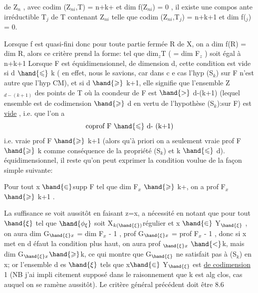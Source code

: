 
de Z$_n$ , avec codim (Z$_{ni}$,T) = n+k+ et dim f(Z$_{ni}$) = 0 , il existe
une compos ante irréductible T$_j$ de T contenant Z$_{ni}$ telle que
codim (Z$_{ni}$,T$_j$) = n+k+1 et dim f($_j$) = 0.

Lorsque f est quasi-fini donc pour toute partie fermée R de X,
on a dim f(R) = dim R, alors ce critère prend la forme:  
  tel que dim$_z$T ( = dim F$_z$ ) soit égal à
n+k+1  Lorsque F est équidimensionnel, 
de dimension d,  cette condition
est vide si d $\hand{\leqslant}$ k ( en effet, nous le savions, car dans c e cas l'hyp
(S$_k$) sur F n'est autre que l'hyp CM), et si d $\hand{\geqslant}$ k+1, elle signifie
que l'ensemble Z$_{d - (k+1)}$ des points de T où la coondeur de F est
$\hand{>}$ d-(k+1) (lequel ensemble est de codimension $\hand{\geqslant}$ d  en vertu de
l'hypothèse (S$_k$):sur F) est \uline{vide} , i.e. que 
l'on a 
\[ \text{coprof F } \hand{\leqslant} \text{ d- (k+1)} \]
i.e. vraie prof F $\hand{\geqslant}$ k+1
(alors qu'à priori on a seulement vraie prof F $\hand{\geqslant}$ k comme conséquence
de la propriété (S$_k$) et k $\hand{\leqslant}$ d).  
 équidimensionnel, il reste qu'on
peut exprimer la condition voulue de la façon simple suivante:

 Pour tout  x $\hand{\in}$supp F tel que dim F$_x$ $\hand{\geqslant}$ k+, on a prof F$_x$ $\hand{\geqslant}$ k+1 .

La suffisance se voit aussitôt en faisant z=x, a nécessité   en
notant que pour tout $\hand{\xi}$ tel que $\hand{\phi_\xi}$ soit X$_{k(\hand{\xi})}$\hand{\unsure{$-$|$+$}}régulier et x $\hand{\in}$ Y$_{\hand{\xi}}$ ,
on aura dim G$_{\hand{\xi} x}$ = dim F$_x$ - 1 , prof G$_{\hand{\xi} x}$ = prof F$_x$ - 1 , donc si
x met en d éfaut la condition plus haut, on aura prof $_{\hand{\xi} x}$ $\hand{<}$k, mais
dim G$_{\hand{\xi} x}$$\hand{\geqslant}$k, ce qui montre que G$_{\hand{\xi}}$ ne satisfait pas à (S$_k$) en x; or
l'ensemble d es $\hand{\xi}$ tels que x$\hand{\in}$ Y$_{\hand{\xi}}$ est \uline{de codimension} 1 (NB j'ai impli
\margin{|} citement supposé dans le raisonnement que k est alg clos, cas auquel on
se ramène aussitôt). Le critère général précédent doit être   8.6
